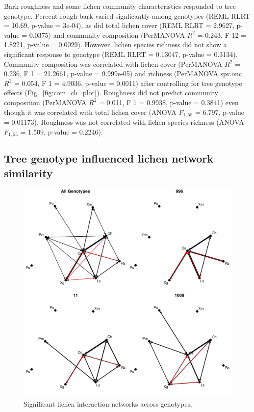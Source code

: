 \documentclass[9pt,twocolumn,twoside,lineno]{pnas-new}
\begin{document}
{Bark roughness and some lichen community characteristics responded to
tree genotype. Percent rough bark varied signficantly among genotypes
(REML RLRT = 10.69, p-value = 3e-04), as did total lichen cover (REML
RLRT = 2.9627, p-value = 0.0375) and community composition (PerMANOVA
$R^2$ = 0.243, F 12 = 1.8221, p-value = 0.0029). However, lichen
species richness did not show a significant response to genotype (REML
RLRT = 0.13047, p-value = 0.3134). Community composition was
correlated with lichen cover (PerMANOVA $R^2$ = 0.236, F 1 = 21.2661,
p-value = 9.999e-05) and richness (PerMANOVA spr.onc $R^2$ = 0.054, F
1 = 4.9036, p-value = 0.0011) after controlling for tree genotype
effects (Fig.~\ref{fig:com_ch_plot}). Roughness did not predict
community composition (PerMANOVA $R^2$ = 0.011, F 1 = 0.9938, p-value
= 0.3841) even though it was correlated with total lichen cover (ANOVA
$F_{1,55}$ = 6.797, p-value = 0.01173). Roughness was not correlated
with lichen species richness (ANOVA $F_{1, 55}$ = 1.509, p-value =
0.2246).


\subsection*{Tree genotype influenced lichen network similarity}

\begin{figure}[ht]
\centering
\includegraphics[width=\linewidth]{cn_onc.pdf}
\caption{Significant lichen interaction networks across genotypes.}
\label{fig:geno_nets}
\end{figure}


}
\end{document}
